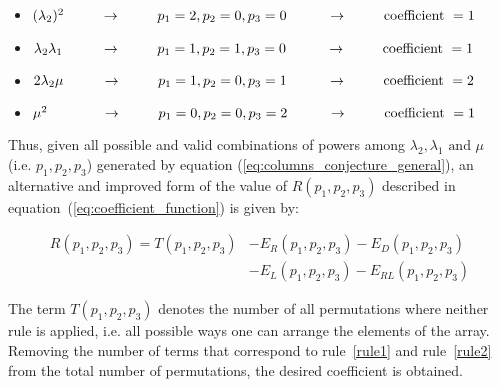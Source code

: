 \begin{itemize}
    \item \((\lambda_2)^2 \hspace{0.9cm} \rightarrow \hspace{0.9cm}
    p_1 = 2, p_2=0, p_3=0 \hspace{1cm} \rightarrow \hspace{0.9cm}
    \text{coefficient } = 1\)
    \item \(\lambda_2 \lambda_1 \hspace{0.95cm} \rightarrow \hspace{0.9cm}
    p_1 = 1, p_2=1, p_3=0 \hspace{1cm} \rightarrow \hspace{0.9cm}
    \text{coefficient } = 1\)
    \item \(2 \lambda_2 \mu \hspace{0.95cm} \rightarrow \hspace{0.9cm}
     p_1 = 1, p_2=0, p_3=1 \hspace{1cm} \rightarrow \hspace{0.9cm}
     \text{coefficient } = 2\)
    \item \(\mu^2 \hspace{1.35cm} \rightarrow \hspace{0.9cm}
    p_1=0, p_2=0, p_3=2 \hspace{1cm} \rightarrow \hspace{0.9cm}
    \text{coefficient } = 1\)
\end{itemize}

Thus, given all possible and valid combinations of powers among \(\lambda_2,
\lambda_1 \text{ and } \mu\) (i.e. \(p_1,p_2,p_3\)) generated by equation
(\ref{eq:columns_conjecture_general}), an alternative and improved form of the
value of \(R(p_1, p_2, p_3)\) described in
equation~(\ref{eq:coefficient_function}) is given by:

\begin{align}\label{eq:permutation formula}
    R(p_1, p_2, p_3) = T(p_1, p_2, p_3) & - E_R(p_1, p_2, p_3)
    - E_D(p_1, p_2, p_3) \nonumber \\
    & - E_L(p_1, p_2, p_3) - E_{RL}(p_1, p_2, p_3)
\end{align}


The term \(T(p_1,p_2,p_3)\) denotes the number of all permutations where neither
rule is applied, i.e. all possible ways one can arrange the elements of the
array.
Removing the number of terms that correspond to rule~\ref{rule1} and
rule~\ref{rule2} from the total number of permutations, the desired
coefficient is obtained.

